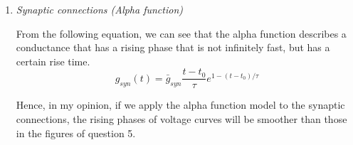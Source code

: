 \documentclass[12pt]{article}
\begin{document}
\begin{enumerate}
    
    \item \textit{Synaptic connections (Alpha function)  }
    
    From the following equation, we can see that the alpha function describes a conductance that has a rising phase that is not infinitely fast, but has a certain rise time\citep{roth2009modeling}. 
    \begin{equation}
    	g_{syn}(t)=\bar{g}_{syn}\frac{t-t_0}{\tau}e^{1-(t-t_0)/\tau}
    \end{equation}
    
    Hence, in my opinion, if we apply the alpha function model to the synaptic connections, the rising phases of voltage curves will be smoother than those in the figures of question 5.

  \end{enumerate}
  
\end{document}
